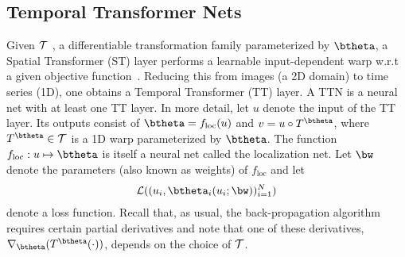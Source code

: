 \subsection{Temporal Transformer Nets} 
Given $\mathcal{T}$ , a differentiable transformation family parameterized by $\btheta$, a Spatial Transformer (ST) layer performs a
 learnable input-dependent warp w.r.t a given objective function~\cite{Jaderberg:NIPS:2015:spatial}.
  Reducing this from images (a 2D domain) to time series (1D), one obtains a Temporal Transformer (TT) layer. A TTN is a neural net with at least one TT layer. In more detail, let $u$ denote the input of the TT layer. Its outputs consist of $\btheta = f_{\mathrm{loc}}(u)$ and
$v=u\circ T^{\btheta}$, where
$T^{\btheta} \in \Tcal$ is a 1D warp parameterized by $\btheta$. The function $f_{\mathrm{loc}}: u \mapsto \btheta$ is itself a
 neural net called the localization net. Let $\bw$ denote the parameters (also known as weights) of $f_{\mathrm{loc}}$ and let
\begin{align}
  \Lcal((u_i,\btheta_i(u_i;\bw))_{i=1}^N)
\end{align}
denote a loss function. Recall that, as usual, the back-propagation algorithm requires certain partial derivatives and note that one of these derivatives, $\nabla_\btheta (T^{\btheta}( \cdot))$, depends on the choice of $\mathcal{T}$.

